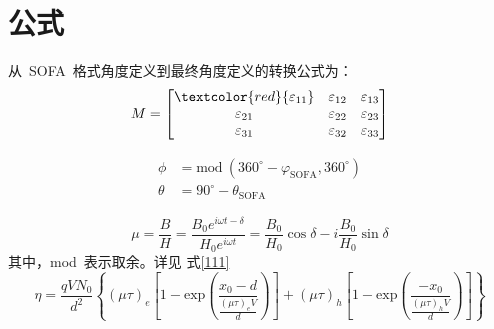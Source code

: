 \section{公式}
从~SOFA~格式角度定义到最终角度定义的转换公式为：
\[
M=
\left[
\begin{matrix}
	\textcolor{red}{\varepsilon_{11}} & \varepsilon_{12} & \varepsilon_{13}\\
	\varepsilon_{21} & \varepsilon_{22} & \varepsilon_{23}\\
	\varepsilon_{31} & \varepsilon_{32} & \varepsilon_{33}\\
\end{matrix}\right]
\]

\begin{align}
	\label{111}
	\phi & = \text{mod}~\left( 360^{\circ}-\varphi_{\text{SOFA}}, 360^{\circ} \right)  \nonumber \\
	\theta & =  90^{\circ} - \theta_{\text{SOFA}} 	
\end{align}

\[
\mu = \frac{B}{H}=\frac{B_0 e^{i\omega t-\delta}}{H_0 e^{i\omega t}}=\frac{B_0}{H_0}\cos\delta-i\frac{B_0}{H_0}\sin\delta
\]
其中，mod~表示取余。详见 式\ref{111}
\begin{equation}
\eta = \frac{qVN_0}{d^2}\left\{(\mu\tau)_e \left[1-\text{exp}\left(\frac{x_0-d}{\frac{(\mu\tau)_e V}{d}}\right)\right]+(\mu\tau)_h \left[1-\text{exp}\left(\frac{-x_0}{\frac{(\mu\tau)_h V}{d}}\right)\right]\right\}
\end{equation}
